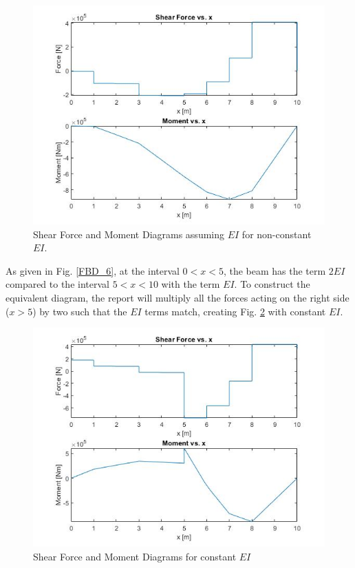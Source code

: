 \documentclass[a4paper]{article}
\begin{document}
\begin{figure}[h]
\includegraphics[width=\textwidth]{results/noneq6.jpg}
\caption{Shear Force and Moment Diagrams assuming $EI$ for non-constant $EI$.}
\label{noneq6}
\end{figure}

As given in Fig. \ref{FBD_6}, at the interval $0<x<5$, the beam has the term $2EI$ compared to the interval $5<x<10$ with the term $EI$. To construct the equivalent diagram, the report will multiply all the forces acting on the right side ($x>5$) by two such that the $EI$ terms match, creating Fig. \ref{eq6} with constant $EI$.

\begin{figure}[h]
\includegraphics[width=\textwidth]{results/eq6.jpg}
\caption{Shear Force and Moment Diagrams for constant $EI$}
\label{eq6}
\end{figure}
\end{document}
